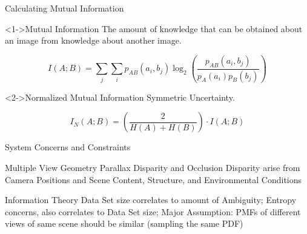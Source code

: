 \documentclass[serif]{beamer}
\begin{document}
\begin{frame}[c]{\sc Calculating Mutual Information}

\begin{block}<1->{Mutual Information}
The amount of knowledge that can be obtained about an image from knowledge about another image.

\begin{equation}
\label{MutualInformation}
	I(A;B) = \sum_{j}{\sum_{i}{p_{AB}(a_{i},b_{j}) \log_{2}{\left( \frac{p_{AB}(a_{i},b_{j})}{p_{A}(a_{i})p_{B}(b_{j})}\right)}}}
\end{equation}
\end{block}


\vfill

\begin{block}<2->{Normalized Mutual Information}
Symmetric Uncertainty.

\begin{equation}
\label{NormalizedMutualInformation}
	I_{N}(A;B) = \left( \frac{2}{H(A) + H(B)}\right) \cdot I(A;B)
\end{equation}
\end{block}

\end{frame}


\begin{frame}[t]{\sc System Concerns and Constraints}

\begin{block}{Multiple View Geometry}
Parallax Disparity and Occlusion Disparity arise from Camera Positions and Scene Content, Structure, and Environmental Conditions
\end{block}

\begin{block}{Information Theory}
Data Set size correlates to amount of Ambiguity; Entropy concerns, also correlates to Data Set size; Major Assumption: PMFs of different views of same scene should be similar (sampling the same PDF)
\end{block}

\end{frame}
\end{document}
